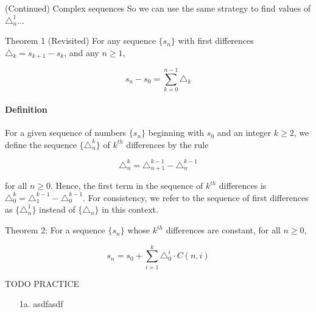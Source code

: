 {\begin{intro}{(Continued) Complex sequences}
        So we can use the same strategy to find values of $\triangle_{n}^{1}$...
    \end{intro}


    \begin{intro}{Theorem 1 (Revisited)}
        For any sequence $\{s_{n}\}$ with first differences $\triangle_{k} = s_{k+1} - s_{k}$,
        and any $n \geq 1$,

        $$s_{n} - s_{0} = \sum_{k=0}^{n-1}{ \triangle_{k} } $$
    \end{intro}

    \begin{introNOHEAD}
        \paragraph{Definition}
        For a given sequence of numbers $\{s_{n}\}$ beginning with $s_{0}$ and
        an integer $k \geq 2$, we define the sequence $\{\triangle_{n}^{k}\}$
        of $k^{th}$ differences by the rule

        $$\triangle_{n}^{k} = \triangle_{n+1}^{k-1} - \triangle_{n}^{k-1}$$

        for all $n \geq 0$. Hence, the first term in the sequence of $k^{th}$
        differences is $\triangle_{0}^{k} = \triangle_{1}^{k-1} - \triangle_{0}^{k-1}$.
        For consistency, we refer to the sequence of first differences as
        $\{\triangle_{n}^{1}\}$ instead of $\{\triangle_{n}\}$ in this context.
    \end{introNOHEAD}

    \begin{intro}{Theorem 2:}
        For a sequence $\{s_{n}\}$ whose $k^{th}$ differences are constant,
        for all $n \geq 0$,

        $$s_{n} = s_{0} + \sum_{i=1}^{k}{ \triangle_{0}^{i} \cdot C(n,i) }$$
    \end{intro}

    \newpage
    
    \begin{questionNOGRADE}{\thequestion}
        TODO PRACTICE
    \end{questionNOGRADE}

    
}{

    \begin{enumerate}
        \item[1a.]  asdfasdf
    \end{enumerate}

}


